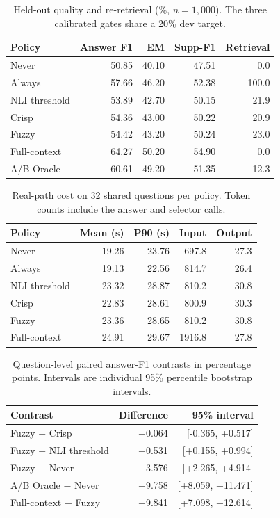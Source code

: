 \begin{table}[!t]
\centering
\caption{Held-out quality and re-retrieval (\%, $n=1{,}000$). The three calibrated gates share a 20\% dev target.}
\label{tab:quality}
\footnotesize
\setlength{\tabcolsep}{3.5pt}
\begin{tabular}{lrrrr}
\hline
Policy & Answer F1 & EM & Supp-F1 & Retrieval \\
\hline
Never & 50.85 & 40.10 & 47.51 & 0.0 \\
Always & 57.66 & 46.20 & 52.38 & 100.0 \\
NLI threshold & 53.89 & 42.70 & 50.15 & 21.9 \\
Crisp & 54.36 & 43.00 & 50.22 & 20.9 \\
Fuzzy & 54.42 & 43.20 & 50.24 & 23.0 \\
Full-context & 64.27 & 50.20 & 54.90 & 0.0 \\
A/B Oracle & 60.61 & 49.20 & 51.35 & 12.3 \\
\hline
\end{tabular}
\end{table}

\begin{table}[!t]
\centering
\caption{Real-path cost on 32 shared questions per policy. Token counts include the answer and selector calls.}
\label{tab:cost}
\footnotesize
\setlength{\tabcolsep}{3.5pt}
\begin{tabular}{lrrrr}
\hline
Policy & Mean (s) & P90 (s) & Input & Output \\
\hline
Never & 19.26 & 23.76 & 697.8 & 27.3 \\
Always & 19.13 & 22.56 & 814.7 & 26.4 \\
NLI threshold & 23.32 & 28.87 & 810.2 & 30.8 \\
Crisp & 22.83 & 28.61 & 800.9 & 30.3 \\
Fuzzy & 23.36 & 28.65 & 810.2 & 30.8 \\
Full-context & 24.91 & 29.67 & 1916.8 & 27.8 \\
\hline
\end{tabular}
\end{table}

\begin{table}[!t]
\centering
\caption{Question-level paired answer-F1 contrasts in percentage points. Intervals are individual 95\% percentile bootstrap intervals.}
\label{tab:paired}
\footnotesize
\setlength{\tabcolsep}{3.5pt}
\begin{tabular}{lrr}
\hline
Contrast & Difference & 95\% interval \\
\hline
Fuzzy $-$ Crisp & +0.064 & [-0.365, +0.517] \\
Fuzzy $-$ NLI threshold & +0.531 & [+0.155, +0.994] \\
Fuzzy $-$ Never & +3.576 & [+2.265, +4.914] \\
A/B Oracle $-$ Never & +9.758 & [+8.059, +11.471] \\
Full-context $-$ Fuzzy & +9.841 & [+7.098, +12.614] \\
\hline
\end{tabular}
\end{table}

